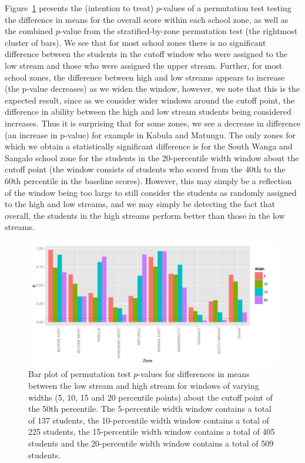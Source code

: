 \documentclass[11pt]{article}
\begin{document}
Figure~\ref{fig:pval_window} presents the (intention to treat) $p$-values of a permutation test testing the difference in means for the overall score within each school zone, as well as the combined $p$-value from the stratified-by-zone permutation test (the rightmost cluster of bars). We see that for most school zones there is no significant difference between the students in the cutoff window who were assigned to the low stream and those who were assigned the upper stream. Further, for most school zones, the difference between high and low streams appears to increase (the p-value decreases) as we widen the window, however, we note that this is the expected result, since as we consider wider windows around the cutoff point, the difference in ability between the high and low stream students being considered increases. Thus it is surprising that for some zones, we see a decrease in difference (an increase in p-value) for example in Kabula and Matungu. The only zones for which we obtain a statistically significant difference is for the South Wanga and Sangalo school zone for the students in the 20-percentile width window about the cutoff point (the window consists of students who scored from the 40th to the 60th percentile in the baseline scores). However, this may simply be a reflection of the window being too large to still consider the students as randomly assigned to the high and low streams, and we may simply be detecting the fact that overall, the students in the high streams perform better than those in the low streams. 
 
  \begin{figure}[H]
 \centering
 \includegraphics[scale=0.6]{RD_pval.pdf}
 \caption{Bar plot of permutation test $p$-values for differences in means between the low stream and high stream for windows of varying widths (5, 10, 15 and 20 percentile points) about the cutoff point of the 50th percentile. The 5-percentile width window contains a total of 137 students, the 10-percentile width window contains a total of 225 students, the 15-percentile width window contains a total of 405 students and the 20-percentile width window contains a total of 509 students.}
 \label{fig:pval_window}
 \end{figure}
 
\end{document}
